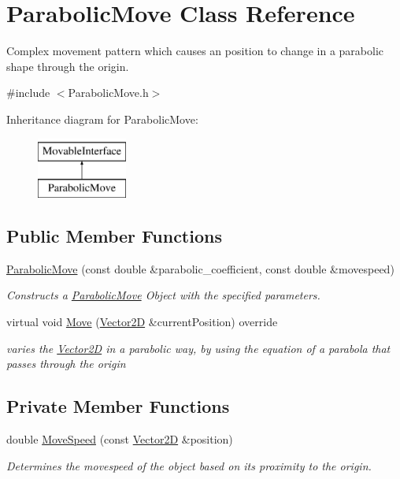 \hypertarget{class_parabolic_move}{}\section{Parabolic\+Move Class Reference}
\label{class_parabolic_move}


Complex movement pattern which causes an position to change in a parabolic shape through the origin.  




{\ttfamily \#include $<$Parabolic\+Move.\+h$>$}

Inheritance diagram for Parabolic\+Move\+:\begin{figure}[H]
\begin{center}
\leavevmode
\includegraphics[height=2.000000cm]{d3/da6/class_parabolic_move}
\end{center}
\end{figure}
\subsection*{Public Member Functions}
\begin{DoxyCompactItemize}
\item 
\hyperlink{class_parabolic_move_a94fb02788b26d03abccee8254401902d}{Parabolic\+Move} (const double \&parabolic\+\_\+coefficient, const double \&movespeed)
\begin{DoxyCompactList}\small\item\em Constructs a \hyperlink{class_parabolic_move}{Parabolic\+Move} Object with the specified parameters. \end{DoxyCompactList}\item 
virtual void \hyperlink{class_parabolic_move_a577831644247ca57aa1c2c88843c779b}{Move} (\hyperlink{class_vector2_d}{Vector2D} \&current\+Position) override
\begin{DoxyCompactList}\small\item\em varies the \hyperlink{class_vector2_d}{Vector2D} in a parabolic way, by using the equation of a parabola that passes through the origin \end{DoxyCompactList}\end{DoxyCompactItemize}
\subsection*{Private Member Functions}
\begin{DoxyCompactItemize}
\item 
double \hyperlink{class_parabolic_move_a1fde73a6298c970648344e0e232659d5}{Move\+Speed} (const \hyperlink{class_vector2_d}{Vector2D} \&position)
\begin{DoxyCompactList}\small\item\em Determines the movespeed of the object based on its proximity to the origin. \end{DoxyCompactList}\end{DoxyCompactItemize}
